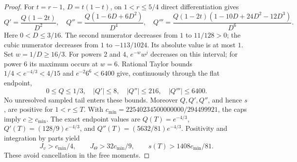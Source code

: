 \documentclass[11pt]{article}
\begin{document}
\begin{proof}
For $t=r-1$, $D=t(1-t)$, on $1<r\le5/4$ direct differentiation gives
\begin{equation}
 Q'=\frac{Q(1-2t)}{D^2},\quad
 Q''=\frac{Q(1-6D+6D^2)}{D^4},\quad
 Q'''=\frac{Q(1-2t)(1-10D+24D^2-12D^3)}{D^6}.
 \label{eq:Qderivs}
\end{equation}
Here $0<D\le3/16$. The second numerator decreases from $1$ to
$11/128>0$; the cubic numerator decreases from $1$ to $-113/1024$.
Its absolute value is at most $1$. Set $w=1/D\ge16/3$.
For powers $2$ and $4$, $e^{-w}w^j$ decreases on this interval;
for power $6$ its maximum occurs at $w=6$. Rational Taylor bounds
$1/4<e^{-4/3}<4/15$ and $e^{-2}6^6<6400$ give, continuously through
the flat endpoint,
\begin{equation}
 0\le Q\le1/3,\quad |Q'|\le8,\quad |Q''|\le216,\quad
 |Q'''|\le6400. \label{eq:bumpcaps}
\end{equation}
No unresolved sampled tail enters these bounds. Moreover
$Q,Q',Q''$, and hence $s$, are positive for $1<r\le T$.
With $c_{\min}=22540234500000000/294499921$, the caps imply
$c\ge c_{\min}$. The exact endpoint values are
$Q(T)=e^{-4/3}$, $Q'(T)=(128/9)e^{-4/3}$, and
$Q''(T)=(5632/81)e^{-4/3}$. Positivity and integration by parts yield
\begin{equation}
 J_v>c_{\min}/4,\qquad
 J_\Theta>32c_{\min}/9,\qquad s(T)>1408c_{\min}/81. \label{eq:freegates}
\end{equation}
These avoid cancellation in the free moments.


\end{proof}
\end{document}
